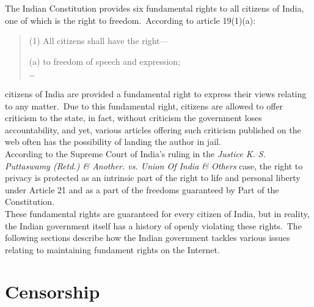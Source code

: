 \documentclass[11pt,a4paper,oneside]{scrarticle}
\begin{document}
    The Indian Constitution provides six fundamental rights to all citizens of India, one of which is the right to
    freedom.\ According to article 19(1)(a):
    \begin{quote}
        \singlespacing
        (1)
        All citizens shall have the right---\\
        \vspace*{-15pt}
        \begin{enumerate}
        (a)
            to freedom of speech and expression;\\
            \ldots
        \end{enumerate}
    \end{quote}
    citizens of India are provided a fundamental right to express their views relating to any matter.\ Due to this
    fundamental right, citizens are allowed to offer criticism to the state, in fact, without criticism the government
    loses accountability, and yet, various articles offering such criticism published on the web often has the
    possibility of landing the author in jail.
    \\
    According to the Supreme Court of India's ruling in the
    \textit{Justice K. S. Puttaswamy (Retd.) \& Another. vs. Union Of India \& Others} case, the right to privacy is
    protected as an intrinsic part of the right to life and personal liberty under Article 21 and as a part of the
    freedoms guaranteed by Part  of the Constitution.
    \\
    These fundamental rights are guaranteed for every citizen of India, but in reality, the Indian government itself has
    a history of openly violating these rights.\ The following sections describe how the Indian government tackles
    various issues relating to maintaining fundament rights on the Internet.




    \section{Censorship}\label{sec:censorship}
\end{document}
